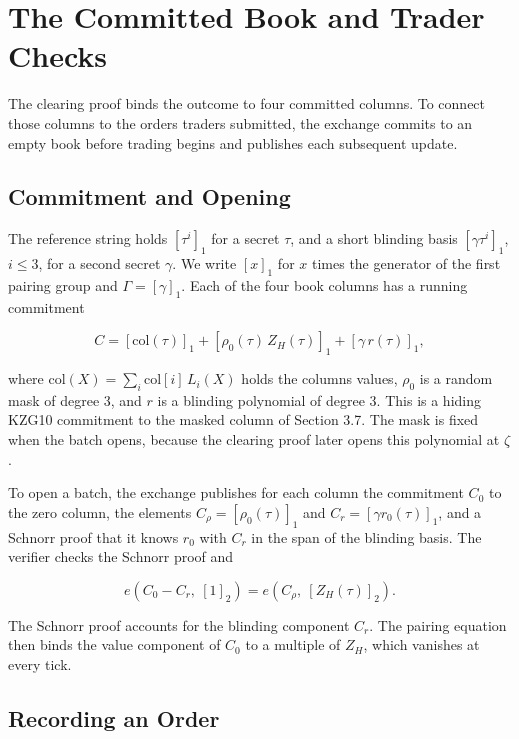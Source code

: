 
\section{The Committed Book and Trader Checks}

The clearing proof binds the outcome to four committed columns. To connect those columns to the orders traders submitted, the exchange commits to an empty book before trading begins and publishes each subsequent update.

\subsection{Commitment and Opening}

The reference string holds \([\tau^i]_1\) for a secret \(\tau\), and a short blinding basis \([\gamma\tau^i]_1\), \(i \le 3\), for a second secret \(\gamma\). We write \([x]_1\) for \(x\) times the generator of the first pairing group and \(\Gamma = [\gamma]_1\). Each of the four book columns has a running commitment

\[C = [\mathrm{col}(\tau)]_1 + [\rho_0(\tau)\,Z_H(\tau)]_1 + [\gamma\, r(\tau)]_1,\]

where \(\mathrm{col}(X) = \sum_i \mathrm{col}[i]\, L_i(X)\) holds the column\textquotesingle s values, \(\rho_0\) is a random mask of degree 3, and \(r\) is a blinding polynomial of degree 3. This is a hiding KZG10 commitment \cite{kzg2010} to the masked column of Section 3.7. The mask is fixed when the batch opens, because the clearing proof later opens this polynomial at \(\zeta\).

To open a batch, the exchange publishes for each column the commitment \(C_0\) to the zero column, the elements \(C_\rho = [\rho_0(\tau)]_1\) and \(C_r = [\gamma r_0(\tau)]_1\), and a Schnorr proof \cite{schnorr1991} that it knows \(r_0\) with \(C_r\) in the span of the blinding basis. The verifier checks the Schnorr proof and

\[e(C_0 - C_r,\ [1]_2) = e(C_\rho,\ [Z_H(\tau)]_2).\]

The Schnorr proof accounts for the blinding component \(C_r\). The pairing equation then binds the value component of \(C_0\) to a multiple of \(Z_H\), which vanishes at every tick.

\subsection{Recording an Order}

